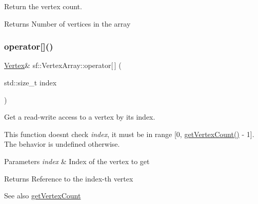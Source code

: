Return the vertex count. 

\begin{DoxyReturn}{Returns}
Number of vertices in the array \begin{DoxyVerb}\end{DoxyVerb}
 
\end{DoxyReturn}
\mbox{\label{classsf_1_1_vertex_array_a6006676417d91f42d0278f1abcfe4352}} 
\subsubsection{\texorpdfstring{operator[]()}{operator[]()}\hspace{0.1cm}{\footnotesize\ttfamily [1/2]}}
{\footnotesize\ttfamily \mbox{\hyperlink{classsf_1_1_vertex}{Vertex}}\& sf\+::\+Vertex\+Array\+::operator\mbox{[}$\,$\mbox{]} (\begin{DoxyParamCaption}\item[{std\+::size\+\_\+t}]{index }\end{DoxyParamCaption})}



Get a read-\/write access to a vertex by its index. 

This function doesn\textquotesingle{}t check {\itshape index}, it must be in range \mbox{[}0, \mbox{\hyperlink{classsf_1_1_vertex_array_abda90e8d841a273d93164f0c0032bd8d}{get\+Vertex\+Count()}} -\/ 1\mbox{]}. The behavior is undefined otherwise.


\begin{DoxyParams}{Parameters}
{\em index} & Index of the vertex to get\\
\hline
\end{DoxyParams}
\begin{DoxyReturn}{Returns}
Reference to the index-\/th vertex
\end{DoxyReturn}
\begin{DoxySeeAlso}{See also}
\mbox{\hyperlink{classsf_1_1_vertex_array_abda90e8d841a273d93164f0c0032bd8d}{get\+Vertex\+Count}} \begin{DoxyVerb}\end{DoxyVerb}
 
\end{DoxySeeAlso}
\mbox{\label{classsf_1_1_vertex_array_a6bfcf91c01c754e86ee8b44b6c79441b}} 
